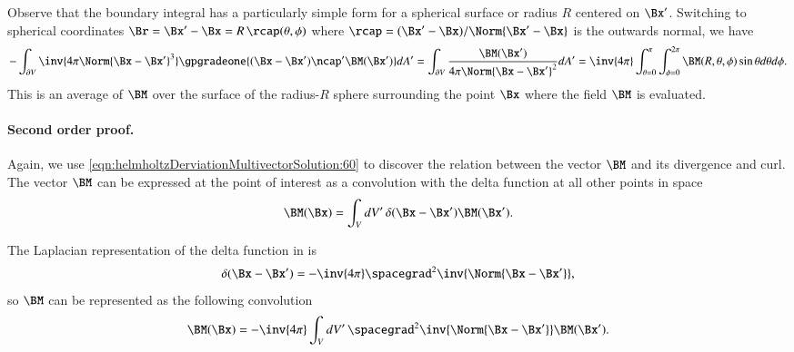 Observe that the boundary integral has a particularly simple form for a spherical surface or radius \( R \) centered on \( \Bx' \).
Switching to spherical coordinates \( \Br = \Bx' - \Bx = R\, \rcap(\theta, \phi) \) where \( \rcap = (\Bx' - \Bx)/\Norm{\Bx' - \Bx} \) is the outwards normal, we have
\begin{dmath}\label{eqn:helmholtzDerviationMultivectorSolution:840}
-
\int_{\partial V}
\inv{4 \pi \Norm{\Bx - \Bx'}^3 }
\gpgradeone{ (\Bx - \Bx') \ncap' \BM(\Bx') } dA'
=
\int_{\partial V}
\frac{\BM(\Bx')}{4 \pi \Norm{\Bx - \Bx'}^2 } dA'
= \inv{4\pi} \int_{\theta = 0}^\pi \int_{\phi = 0}^{2 \pi} \BM(R, \theta, \phi) \sin\theta d\theta d\phi.
\end{dmath}
This is an average of \( \BM \) over the surface of the radius-\(R\) sphere surrounding the point \( \Bx \) where the field \( \BM \) is evaluated.

\paragraph{Second order proof.}

%
%
%

Again, we use \cref{eqn:helmholtzDerviationMultivectorSolution:60}
to discover the relation between the vector \( \BM \) and its divergence and curl.
The vector \( \BM \) can be expressed at the point of interest as a convolution with the delta function at all other points in space
\begin{dmath}\label{eqn:helmholtzDerviationMultivectorSolution:80}
\BM(\Bx) = \int_V dV'\, \delta(\Bx - \Bx') \BM(\Bx').
\end{dmath}

The Laplacian representation of the delta function in  is
\begin{dmath}\label{eqn:helmholtzDerviationMultivectorSolution:100}
\delta(\Bx - \Bx') = -\inv{4\pi} \spacegrad^2 \inv{\Norm{\Bx - \Bx'}},
\end{dmath}
so \( \BM \) can be represented as the following convolution
\begin{dmath}\label{eqn:helmholtzDerviationMultivectorSolution:120}
\BM(\Bx) = -\inv{4\pi} \int_V dV'\, \spacegrad^2 \inv{\Norm{\Bx - \Bx'}} \BM(\Bx').
\end{dmath}

